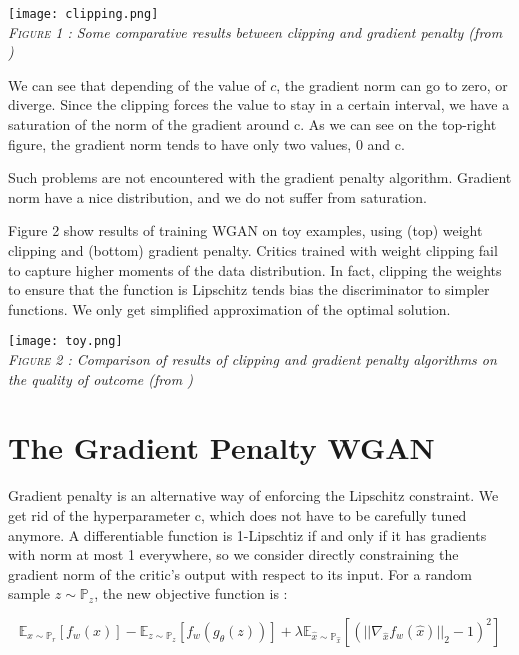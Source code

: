 \documentclass[a4paper]{report}
\newcommand{\Expec}{\mathbb{E}}
\newcommand{\Prob}{\mathbb{P}}
\theoremstyle{plain}
\theoremstyle{remark}
\theoremstyle{definition}
\begin{document}
\begin{center}
\label{fig:1}
	\texttt{[image: clipping.png]} \\
    \emph{\textsc{Figure 1 :} Some comparative results between clipping and gradient penalty (from \cite{gulrajani2017improved})}
\end{center} 

We can see that depending of the value of $c$, the gradient norm can go to zero, or diverge. Since the clipping forces the value to stay in a certain interval, we have a saturation of the norm of the gradient around c. As we can see on the top-right figure, the gradient norm tends to have only two values, 0 and c.

Such problems are not encountered with the gradient penalty algorithm. Gradient norm have a nice distribution, and we do not suffer from saturation.

Figure 2 show results of training WGAN on toy examples, using (top) weight clipping
and (bottom) gradient penalty. Critics trained with weight clipping fail to capture higher moments of the data distribution. In fact, clipping the weights to ensure that the function is Lipschitz tends bias the discriminator to simpler functions. We only get simplified approximation of the optimal solution.

\begin{center}
	\texttt{[image: toy.png]} \\
    \emph{\textsc{Figure 2 :} Comparison of results of clipping and gradient penalty algorithms on the quality of outcome (from \cite{gulrajani2017improved})}
\end{center} 

\section{The Gradient Penalty WGAN}

Gradient penalty is an alternative way of enforcing the Lipschitz constraint. We get rid of the hyperparameter c, which does not have to be carefully tuned anymore.
A differentiable function is 1-Lipschtiz if and only if it has gradients with norm at most 1 everywhere, so we consider directly constraining the gradient norm of the critic’s output with respect to its input.
For a random sample $z \sim \Prob_z$, the new objective function is :

\begin{equation}
\label{eq:grad_pen}
\Expec_{x \sim \Prob_r} [f_w(x)] - \Expec_{z \sim \Prob_z} [f_w(g_\theta(z))] + \lambda
 \Expec_{\hat{x} \sim \Prob_{\hat{x}}} [ (||\nabla_{\hat{x}} f_w(\hat{x})||_2 -1)^2] 
\end{equation}
\end{document}
